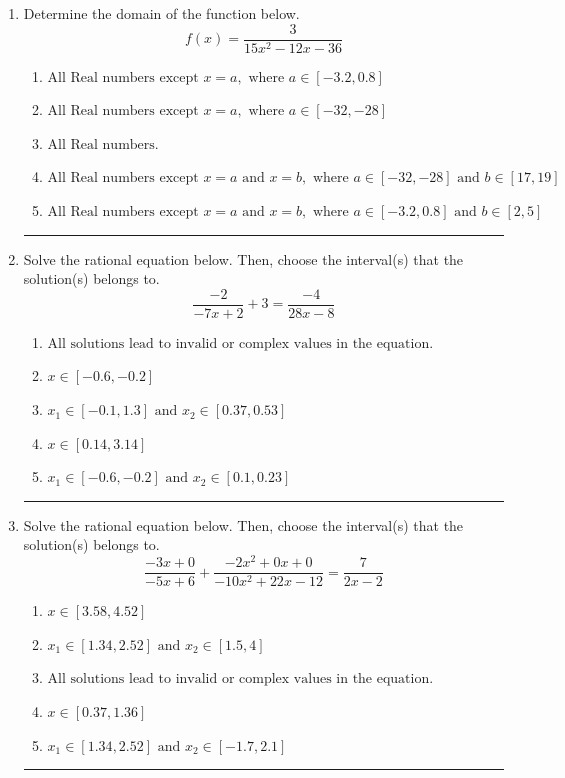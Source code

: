\documentclass[14pt]{extbook}
\newcommand{\litem}[1]{\item#1\hspace*{-1cm}\rule{\textwidth}{0.4pt}}
\begin{document}
\begin{enumerate}
\litem{
Determine the domain of the function below.\[ f(x) = \frac{3}{15x^{2} -12 x -36} \]\begin{enumerate}[label=\Alph*.]
\item \( \text{All Real numbers except } x = a, \text{ where } a \in [-3.2, 0.8] \)
\item \( \text{All Real numbers except } x = a, \text{ where } a \in [-32, -28] \)
\item \( \text{All Real numbers.} \)
\item \( \text{All Real numbers except } x = a \text{ and } x = b, \text{ where } a \in [-32, -28] \text{ and } b \in [17, 19] \)
\item \( \text{All Real numbers except } x = a \text{ and } x = b, \text{ where } a \in [-3.2, 0.8] \text{ and } b \in [2, 5] \)

\end{enumerate} }
\litem{
Solve the rational equation below. Then, choose the interval(s) that the solution(s) belongs to.\[ \frac{-2}{-7x + 2} + 3 = \frac{-4}{28x -8} \]\begin{enumerate}[label=\Alph*.]
\item \( \text{All solutions lead to invalid or complex values in the equation.} \)
\item \( x \in [-0.6,-0.2] \)
\item \( x_1 \in [-0.1, 1.3] \text{ and } x_2 \in [0.37,0.53] \)
\item \( x \in [0.14,3.14] \)
\item \( x_1 \in [-0.6, -0.2] \text{ and } x_2 \in [0.1,0.23] \)

\end{enumerate} }
\litem{
Solve the rational equation below. Then, choose the interval(s) that the solution(s) belongs to.\[ \frac{-3x + 0}{-5x + 6} + \frac{-2x^{2} +0 x + 0}{-10x^{2} +22 x -12} = \frac{7}{2x -2} \]\begin{enumerate}[label=\Alph*.]
\item \( x \in [3.58,4.52] \)
\item \( x_1 \in [1.34, 2.52] \text{ and } x_2 \in [1.5,4] \)
\item \( \text{All solutions lead to invalid or complex values in the equation.} \)
\item \( x \in [0.37,1.36] \)
\item \( x_1 \in [1.34, 2.52] \text{ and } x_2 \in [-1.7,2.1] \)


\end{enumerate}}
\end{enumerate}
\end{document}
